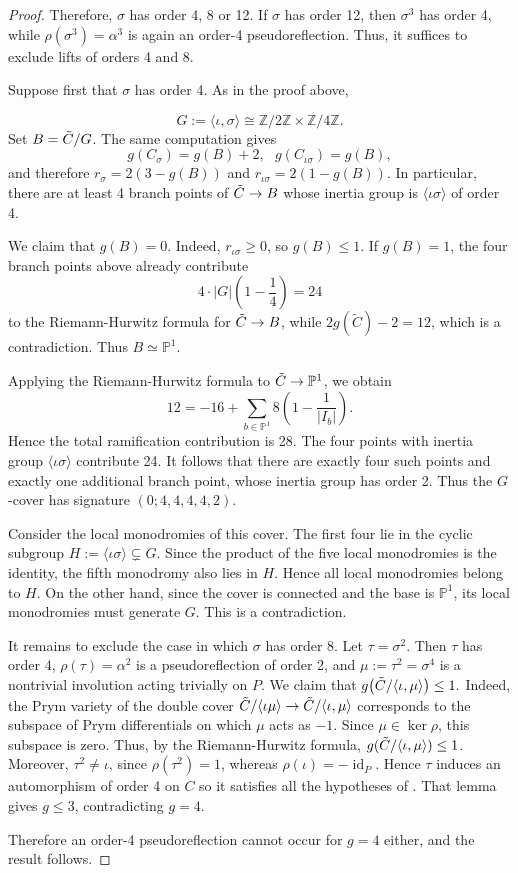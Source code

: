 \documentclass{article}
\numberwithin{equation}{section}
\newcommand{\tC}{\Tilde{C}}
\DeclareMathOperator{\id}{id}
\begin{document}
\begin{proof}
Therefore, $\sigma$ has order 4, 8 or 12. If $\sigma$ has order 12, then $\sigma^3$ has order 4, while
$\rho(\sigma^3)=\alpha^3$ is again an order-4 pseudoreflection. Thus, it suffices to exclude lifts of orders 4 and 8.

Suppose first that $\sigma$ has order 4. As in the proof above,

$$G:=\langle\iota,\sigma\rangle
\cong\mathbb{Z}/2\mathbb{Z}\times\mathbb {Z}/4\mathbb{Z}.$$
Set $B=\tC/G$. The same computation gives
$$g(C_\sigma)=g(B)+2,\ \ \ g(C_{\iota\sigma})=g(B),$$
and therefore
$r_\sigma=2(3-g(B))$ and $ r_{\iota\sigma}=2(1-g(B)).$
In particular, there are at least 4
branch points of $\tC\to B$ whose inertia group is $\langle\iota\sigma\rangle$ of order 4.

We claim that $g(B)=0$. Indeed, $r_{\iota\sigma}\geq0$, so
$g(B)\leq 1$. If $g(B)=1$, the four branch points above already
contribute $$4\cdot |G|\left(1-\frac14\right)=24$$
to the Riemann-Hurwitz formula for $\tC\to B$, while $2g(\widetilde C)-2=12$, which is a contradiction. Thus $B\simeq\mathbb{P}^1$.

Applying the Riemann-Hurwitz formula to 
$\tC\to\mathbb P^1$, we obtain $$12=-16+\sum_{b\in\mathbb P^1}
8\left(1-\frac1{|I_b|}\right).$$
Hence the total ramification contribution is 28. The four points
with inertia group $\langle\iota\sigma\rangle$ contribute 24. It follows that there are exactly four such points and exactly
one additional branch point, whose inertia group has order 2.
Thus the $G$-cover has signature $(0;4,4,4,4,2).$ 

Consider the local monodromies of this cover. The first four lie in
the cyclic subgroup $H:=\langle\iota\sigma\rangle\subsetneq G.$
Since the product of the five local monodromies is the identity, the
fifth monodromy also lies in $H$. Hence all local monodromies belong
to $H$. On the other hand, since the cover is connected and the base
is $\mathbb P^1$, its local monodromies must generate $G$. This is
a contradiction.

It remains to exclude the case in which $\sigma$ has order 8. Let $\tau=\sigma^2$. Then $\tau$ has order $4$, $\rho(\tau)=\alpha^2$ is a
pseudoreflection of order 2, and $\mu:=\tau^2=\sigma^4$ is a nontrivial involution acting trivially on $P$. We claim that $g\bigl(\tC/\langle\iota,\mu\rangle\bigr)\leq1.$ Indeed, the Prym variety of the double cover $\tC/\langle\iota\mu\rangle \to \tC/\langle\iota,\mu\rangle$
corresponds to the subspace of Prym differentials on which $\mu$
acts as $-1$. Since $\mu\in\ker\rho$, this subspace is zero. Thus, by the Riemann-Hurwitz formula, $g(\tC/\langle\iota,\mu\rangle) \leq 1$. Moreover, $\tau^2\neq\iota$, since
$\rho(\tau^2)=1$, whereas $\rho(\iota)=-\id_P$. Hence $\tau$ induces an automorphism of order 4 on $C$ so it satisfies all the hypotheses of \cite[Lemma 3.5]{ALN}. That lemma gives $g\leq3$, contradicting $g=4$.

Therefore an order-4 pseudoreflection cannot occur for $g=4$ either, and the result follows.
\end{proof}
\end{document}
